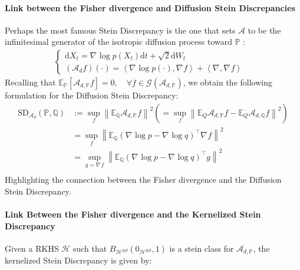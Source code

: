 \documentclass{uai2023} %
\begin{document}
\paragraph{Link between the Fisher divergence and Diffusion Stein Discrepancies}
Perhaps the most famous Stein Discrepancy is the one that sets $ \mathcal  A $
to be the infinitesimal generator of the isotropic diffusion process toward $
\mathbb{ P } $ \cite{gorham2019measuring}:
\begin{equation*}
\begin{aligned}
    \begin{cases}
    \text{d}X_t = \nabla_{  } \log p(X_t) \text{d}t + \sqrt{2} \text{d}W_t & \\
    (\mathcal  A_{d}f)(\cdot)  = \left \langle \nabla_{  }  \log p(\cdot), \nabla_{  }  f   \right \rangle  + \left \langle \nabla_{  } , \nabla_{  } f   \right \rangle 
    \end{cases} 
\end{aligned}
\end{equation*}
Recalling that $ \mathbb{E}_{ \mathbb{   P} }\left [ \mathcal A_{d, \mathbb{ P }} f \right ]  = 0, \quad \forall f \in \mathcal  G(\mathcal  A_{d, \mathbb{ P }}) $,
we obtain the following formulation for the Diffusion Stein Discrepancy:
\begin{equation*}
\begin{aligned}
    \text{SD}_{\mathcal  A_{d}}(\mathbb{ P }, \mathbb{ Q }) &:= \sup_{  f } \left \| \mathbb{E}_{  \mathbb{ Q } } \mathcal  A_{d, \mathbb{ P }} f \right \|^2 (= \sup_{  f } \left \| \mathbb{E}_{  Q } \mathcal  A_{d, \mathbb{ P }} f  - \mathbb{E}_{ Q } \mathcal  A_{d, \mathbb{ Q }} f \right \|^2)  \\
							    &= \sup_{  f } \left \| \mathbb{E}_{  \mathbb{ Q } } (\nabla_{  }   \log p - \nabla_{  }   \log q)^{\top} \nabla_{  }  f  \right \|^2  \\
							    &= \sup_{  g =  \nabla_{  } f  } \left \| \mathbb{E}_{  \mathbb{ Q } } (\nabla_{  }   \log p - \nabla_{  }   \log q)^{\top} g  \right \|^2  \\
\end{aligned}
\end{equation*}
Highlighting the connection between the Fisher divergence and the Diffusion Stein Discrepancy.

\paragraph{Link Between the Fisher divergence and the Kernelized Stein Discrepancy}
Given a RKHS $ \mathcal  H $ such that $  B_{\mathcal  H^{\otimes d}}(0_{\mathcal  H^{\otimes d}}, 1) $
is a stein class for $ \mathcal A_{d, \mathbb{ P }} $, the kernelized Stein
Discrepancy \cite{gorham2017measuring} is given by:
\end{document}
